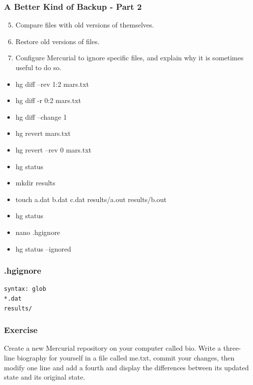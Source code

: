 \documentclass[xcolor=dvipsnames]{beamer}
\begin{document}

\begin{frame}[label=part2]
\frametitle{A Better Kind of Backup - Part 2}
\begin{enumerate}
\setcounter{enumi}{4}
\item Compare files with old versions of themselves.
\item Restore old versions of files.
\item Configure Mercurial to ignore specific files, and explain why it is sometimes useful to do so.
\end{enumerate}
\begin{multicols}{2}
\begin{itemize}
\item hg diff --rev 1:2 mars.txt
\item hg diff -r 0:2 mars.txt
\item hg diff --change 1
\item hg revert mars.txt
\item hg revert --rev 0 mars.txt
\item hg status
\item mkdir results
\item touch a.dat b.dat c.dat results/a.out results/b.out
\item hg status
\item nano .hgignore
\item hg status --ignored
\end{itemize}
\end{multicols}
\end{frame}

\begin{frame}[fragile]
\frametitle{.hgignore}
\begin{verbatim}
syntax: glob
*.dat
results/
\end{verbatim}
\end{frame}


\begin{frame}
\frametitle{Exercise}
Create a new Mercurial repository on your computer called bio. Write a three-line biography for yourself in a file called me.txt, commit your changes, then modify one line and add a fourth and display the differences between its updated state and its original state.
\end{frame}
\end{document}
